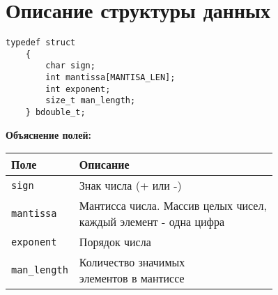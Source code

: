 \section{Описание структуры данных}

\begin{lstlisting}[caption={Структура для хранения длинного числа}, label={lst:listing1}]
	typedef struct 
	{
		char sign;     
		int mantissa[MANTISA_LEN];
		int exponent;         
		size_t man_length; 
	} bdouble_t;
\end{lstlisting}

\noindent\textbf{Объяснение полей:}
\newline
\begin{tabular}{|l|l|}
	\hline
	\textbf{Поле} & \textbf{Описание} \\
	\hline
	\texttt{sign} & Знак числа (+ или -) \\
	\hline
	\texttt{mantissa} & \makecell{Мантисса числа. Массив целых чисел,\\каждый элемент - одна цифра} \\
	\hline
	\texttt{exponent} & Порядок числа \\
	\hline
	\texttt{man\_length} & \makecell{Количество значимых\\элементов в мантиссе }\\
	\hline
\end{tabular}
